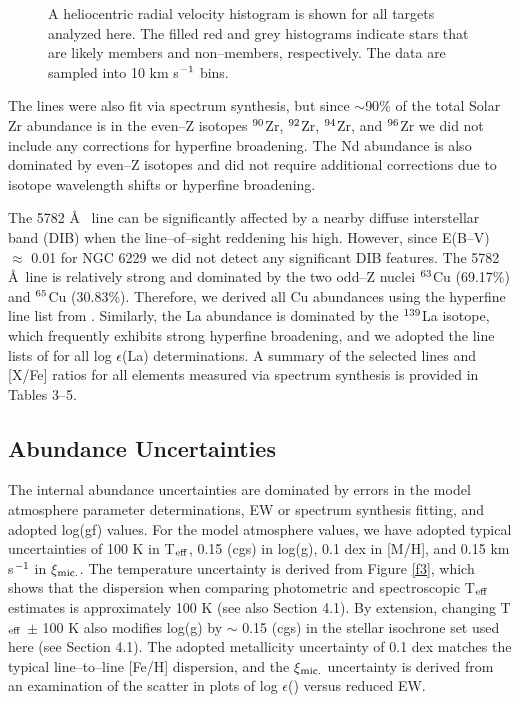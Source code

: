 \documentclass[12pt,preprint]{emulateapj}
\newcommand\iso[2]{$^{\rm #1}$#2}
\begin{document}
\begin{figure}
\caption{A heliocentric radial velocity histogram is shown for all targets
analyzed here.  The filled red and grey histograms indicate stars that are
likely members and non--members, respectively.  The data are sampled into
10 km s$^{\rm -1}$ bins.}
\label{f2}
\end{figure}

The  lines were also fit via spectrum synthesis, but since 
$\sim$90$\%$ of the total Solar Zr abundance is in the even--Z isotopes 
\iso{90}{Zr}, \iso{92}{Zr}, \iso{94}{Zr}, and \iso{96}{Zr} 
\citep[e.g.,][]{Anders89} we did not include any corrections for hyperfine 
broadening.  The Nd abundance is also dominated by even--Z isotopes 
\citep[e.g.,][]{Aoki01,DenHartog03} and did not require additional corrections 
due to isotope wavelength shifts or hyperfine broadening.

The 5782 \AA\  line can be significantly affected by a nearby 
diffuse interstellar band (DIB) when the line--of--sight reddening his high.
However, since E(B--V) $\approx$ 0.01 for NGC 6229 we did not detect any
significant DIB features.  The 5782 \AA\ line is relatively strong
and dominated by the two odd--Z nuclei \iso{63}{Cu} (69.17$\%$) and 
\iso{65}{Cu} (30.83$\%$).  Therefore, we derived all Cu abundances using the
hyperfine line list from \citet{Cunha02}.  Similarly, the La abundance is 
dominated by the \iso{139}{La} isotope, which frequently exhibits strong 
hyperfine broadening, and we adopted the line lists of \citet{Lawler01} for
all log $\epsilon$(La) determinations.  A summary of the selected lines and 
[X/Fe] ratios for all elements measured via spectrum synthesis is provided in 
Tables 3--5.

\subsection{Abundance Uncertainties}

The internal abundance uncertainties are dominated by errors in the model
atmosphere parameter determinations, EW or spectrum synthesis fitting, and 
adopted log(gf) values.  For the model atmosphere values, we have adopted 
typical uncertainties of 100 K in T$_{\rm eff}$, 0.15 (cgs) in log(g), 0.1 dex
in [M/H], and 0.15 km s$^{\rm -1}$ in $\xi$$_{\rm mic.}$.  The temperature
uncertainty is derived from Figure \ref{f3}, which shows that the dispersion
when comparing photometric and spectroscopic T$_{\rm eff}$ estimates is 
approximately 100 K (see also Section 4.1).  By extension, changing 
T$_{\rm eff}$ $\pm$ 100 K also modifies log(g) by $\sim$ 0.15 (cgs) in the 
stellar isochrone set used here (see Section 4.1).  The adopted metallicity
uncertainty of 0.1 dex matches the typical line--to--line [Fe/H] dispersion,
and the $\xi$$_{\rm mic.}$ uncertainty is derived from an examination of the
scatter in plots of log $\epsilon$() versus reduced EW.
\end{document}
